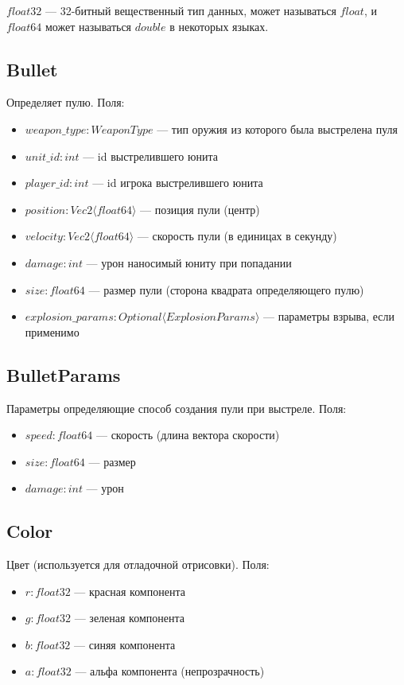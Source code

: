 $float32$ --- 32-битный вещественный тип данных, может называться $float$, и $float64$ может называться $double$ в некоторых языках.

\subsection{Bullet}
Определяет пулю. Поля:
\begin{itemize}
    \item $weapon\_type : WeaponType$ --- тип оружия из которого была выстрелена пуля
    \item $unit\_id : int$ --- id выстрелившего юнита
    \item $player\_id : int$ --- id игрока выстрелившего юнита
    \item $position : Vec2 \langle float64 \rangle$ --- позиция пули (центр)
    \item $velocity : Vec2 \langle float64 \rangle$ --- скорость пули (в единицах в секунду)
    \item $damage : int$ --- урон наносимый юниту при попадании
    \item $size : float64$ --- размер пули (сторона квадрата определяющего пулю)
    \item $explosion\_params : Optional \langle ExplosionParams \rangle$ --- параметры взрыва, если применимо
\end{itemize}

\subsection{BulletParams}
Параметры определяющие способ создания пули при выстреле. Поля:
\begin{itemize}
    \item $speed : float64$ --- скорость (длина вектора скорости)
    \item $size : float64$ --- размер
    \item $damage : int$ --- урон
\end{itemize}

\subsection{Color}
Цвет (используется для отладочной отрисовки). Поля:
\begin{itemize}
    \item $r : float32$ --- красная компонента
    \item $g : float32$ --- зеленая компонента
    \item $b : float32$ --- синяя компонента
    \item $a : float32$ --- альфа компонента (непрозрачность)
\end{itemize}

